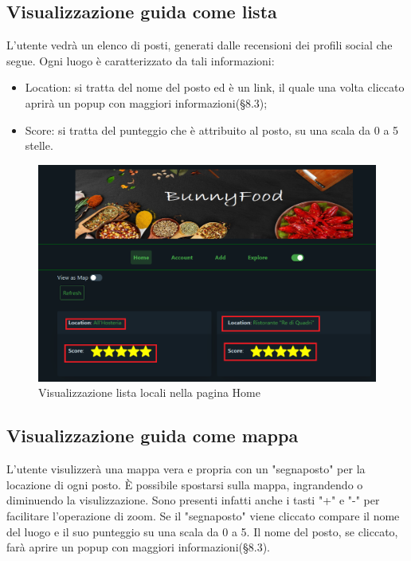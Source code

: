 {    \subsection{Visualizzazione guida come lista} {
        L'utente vedrà un elenco di posti, generati dalle recensioni dei profili social che segue. \aCapo
        Ogni luogo è caratterizzato da tali informazioni: 
        \begin{itemize}
            \item Location: si tratta del nome del posto ed è un link, il quale una volta cliccato aprirà un popup con maggiori informazioni(§8.3); 
            \item Score: si tratta del punteggio che è attribuito al posto, su una scala da 0 a 5 stelle.
        \end{itemize}       
        \begin{figure}[H]
            \includegraphics[width=12cm]{sezioni/images/list-home.png}
            \centering
            \caption{Visualizzazione lista locali nella pagina Home}
        \end{figure}
    }

    \subsection{Visualizzazione guida come mappa} {
        L'utente visulizzerà una mappa vera e propria con un "segnaposto" per la locazione di ogni posto. È possibile spostarsi sulla mappa, ingrandendo o diminuendo la visulizzazione. 
        Sono presenti infatti anche i tasti "+" e "-" per facilitare l'operazione di zoom. \aCapo
        Se il "segnaposto" viene cliccato compare il nome del luogo e il suo punteggio su una scala da 0 a 5. Il nome del posto, se cliccato, farà aprire un popup con maggiori informazioni(§8.3).

}}
